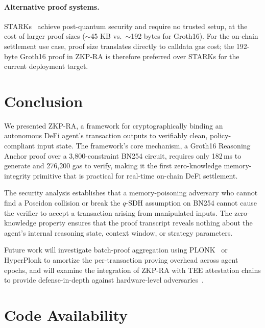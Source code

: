 \documentclass[final,5p,times,twocolumn]{elsarticle}
\theoremstyle{plain}
\theoremstyle{definition}
\theoremstyle{remark}
\begin{document}
\paragraph{Alternative proof systems.}
STARKs~\cite{bensasson2018stark} achieve post-quantum security and require no
trusted setup, at the cost of larger proof sizes ($\sim$45 KB vs.\ $\sim$192
bytes for Groth16). For the on-chain settlement use case, proof size translates
directly to calldata gas cost; the 192-byte Groth16 proof in ZKP-RA is therefore
preferred over STARKs for the current deployment target.

\section{Conclusion}
\label{sec:conclusion}

We presented ZKP-RA, a framework for cryptographically binding an autonomous
DeFi agent's transaction outputs to verifiably clean, policy-compliant input
state. The framework's core mechanism, a Groth16 Reasoning Anchor proof over a
3,800-constraint BN254 circuit, requires only 182\,ms to generate and 276,200
gas to verify, making it the first zero-knowledge memory-integrity primitive
that is practical for real-time on-chain DeFi settlement.

The security analysis establishes that a memory-poisoning adversary who cannot
find a Poseidon collision or break the $q$-SDH assumption on BN254 cannot cause
the verifier to accept a transaction arising from manipulated inputs. The
zero-knowledge property ensures that the proof transcript reveals nothing about
the agent's internal reasoning state, context window, or strategy parameters.

Future work will investigate batch-proof aggregation using PLONK~\cite{plonk2019}
or HyperPlonk to amortize the per-transaction proving overhead across agent
epochs, and will examine the integration of ZKP-RA with TEE attestation chains
to provide defense-in-depth against hardware-level adversaries~\cite{sokaibc2025}.

\section*{Code Availability}
\end{document}
